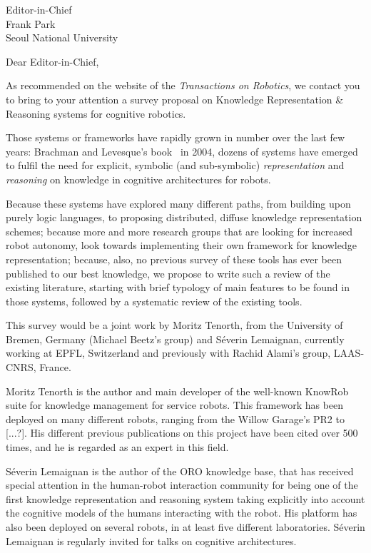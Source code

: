 \documentclass{letter}
\begin{document}
\begin{letter}{Editor-in-Chief \\ Frank Park \\ Seoul National University}
\opening{Dear Editor-in-Chief,}

As recommended on the website of the \emph{Transactions on Robotics}, we contact
you to bring to your attention a survey proposal on Knowledge Representation \&
Reasoning systems for cognitive robotics.

Those systems or frameworks have rapidly grown in number over the last few
years: Brachman and Levesque's book~\cite{brachman2004knowledge} in 2004, dozens
of systems have emerged to fulfil the need for explicit, symbolic (and
sub-symbolic) \emph{representation} and \emph{reasoning} on knowledge in
cognitive architectures for robots.

Because these systems have explored many different paths, from building upon purely
logic languages, to proposing distributed, diffuse knowledge representation
schemes; because more and more research groups that are looking for increased
robot autonomy, look towards implementing their own framework for knowledge
representation; because, also, no previous survey of these tools has ever been
published to our best knowledge, we propose to write such a review of the
existing literature, starting with brief typology of main features to be found
in those systems, followed by a systematic review of the existing tools.

This survey would be a joint work by Moritz Tenorth, from the University of
Bremen, Germany (Michael Beetz's group) and Séverin Lemaignan, currently working
at EPFL, Switzerland and previously with Rachid Alami's group, LAAS-CNRS, France.

Moritz Tenorth is the author and main developer of the well-known {\sc KnowRob}
suite for knowledge management for service robots. This framework has been
deployed on many different robots, ranging from the Willow Garage's PR2 to
[...?]. His different previous publications on this project have been cited over
500 times, and he is regarded as an expert in this field.

Séverin Lemaignan is the author of the {\sc ORO} knowledge base, that has
received special attention in the human-robot interaction community for being
one of the first knowledge representation and reasoning system taking explicitly
into account the cognitive models of the humans interacting with the robot. His
platform has also been deployed on several robots, in at least five different
laboratories. Séverin Lemaignan is regularly invited for talks on cognitive
architectures.


\end{letter}
\end{document}
